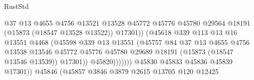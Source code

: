 \begin{lexlean}{RustStd}
\begin{coremodule}
                                              @37
                                              @13
                                              @4655
                                              @4756
                                              @13521
                                              @13528
                                              @45772
                                              @45776
                                              @45780
                                              @29564
                                              @18191
                                              (@15873 (@18547 @13528 @13522))
                                              @17301))
                                          (@45618
                                            @339
                                            @113
                                            @13
                                            @16
                                            @13551
                                            @4468
                                            (@45598
                                              @339
                                              @13
                                              @13551
                                              (@45757
                                                @84
                                                @37
                                                @13
                                                @4655
                                                @4756
                                                @13538
                                                @13546
                                                @45772
                                                @45776
                                                @45780
                                                @29689
                                                @18191
                                                (@15873 (@18547 @13546 @13539))
                                                @17301))
                                            @45820)))))))
                              @45830
                              @45833
                              @45836
                              @45839
                              @17301))
                          @45846
                          (@45857
                            @3846
                            @3879
                            @2615
                            @13705
                            @120
                            @12425

\end{coremodule}
\end{lexlean}
